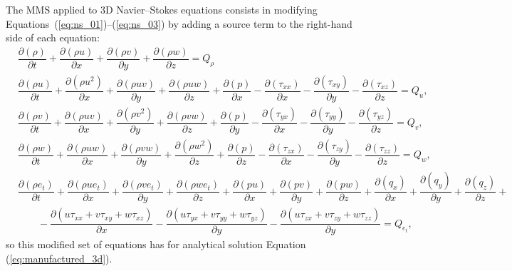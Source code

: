 \documentclass[10pt]{article}
\newcommand{\Diff}[2] {\dfrac{\partial( #1)}{\partial #2}}
\begin{document}
The MMS applied to 3D Navier--Stokes equations consists in modifying Equations~(\ref{eq:ns_01})--(\ref{eq:ns_03}) by adding a source term to the right-hand side of each equation:
\begin{equation}
\begin{split}
\label{eq:ns_3d_mod}
&\Diff{\rho}{t} +\Diff{\rho u}{x}+\Diff{\rho v}{y} + \Diff{\rho w}{z} = Q_\rho\\
%
 &\Diff{\rho u}{t} +\Diff{\rho u^2 }{x}+\Diff{\rho uv}{y} +\Diff{\rho uw}{z} +\Diff{p}{x}-\Diff{\tau_{xx}}{x}-\Diff{\tau_{xy}}{y}-\Diff{\tau_{xz}}{z}= Q_u,\\
%
&\Diff{\rho v}{t} +\Diff{\rho uv }{x}+\Diff{\rho v^2}{y} +\Diff{\rho vw}{z}+\Diff{p}{y}-\Diff{\tau_{yx}}{x}-\Diff{\tau_{yy}}{y}-\Diff{\tau_{yz}}{z}= Q_v,\\
%
&\Diff{\rho w}{t} +\Diff{\rho  uw }{ x}+\Diff{\rho  vw }{ y}+\Diff{\rho w^2 }{ z}+\Diff{p}{z}-\Diff{\tau_{zx}}{x}-\Diff{\tau_{zy}}{y}-\Diff{\tau_{zz}}{z}=Q_w,\\
%
&\Diff{\rho e_t}{t} +\Diff{\rho u e_t}{x}+\Diff{\rho v e_t}{y}+\Diff{\rho we_t}{z}+\Diff{pu}{x}+\Diff{pv}{y}+\Diff{pw}{z} +\Diff{q_x}{x} +\Diff{q_y}{y} +\Diff{q_z}{z}+\\
    &\qquad-\Diff{u\tau_{xx}+v\tau_{xy}+w\tau_{xz}}{x}-\Diff{u\tau_{yx}+v\tau_{yy}+w\tau_{yz}}{y}-\Diff{u\tau_{zx}+v\tau_{zy}+w\tau_{zz}}{y}=Q_{e_t},
\end{split}
\end{equation}
so this modified set of equations has for analytical solution Equation (\ref{eq:manufactured_3d}).
\end{document}
